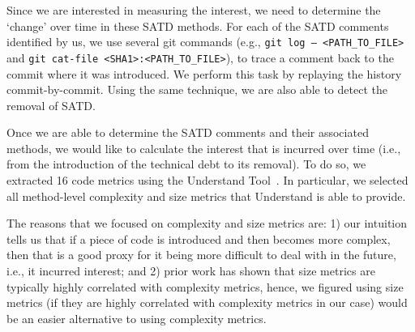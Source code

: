 Since we are interested in measuring the interest, we need to determine the `change' over time in these SATD methods. For each of the SATD comments identified by us, we use several git commands (e.g., {\tt git log -- <PATH\_TO\_FILE>} and {\tt git cat-file <SHA1>:<PATH\_TO\_FILE>}), to trace a comment back to the commit where it was introduced. We perform this task by replaying the history commit-by-commit. Using the same technique, we are also able to detect the removal of SATD.  


Once we are able to determine the SATD comments and their associated methods, we would like to calculate the interest that is incurred over time (i.e., from the introduction of the technical debt to its removal). To do so, we extracted 16 code metrics using the {\sc Understand Tool}~\cite{Understand}. In particular, we selected all method-level complexity and size metrics that Understand is able to provide.

The reasons that we focused on complexity and size metrics are: 1) our intuition tells us that if a piece of code is introduced and then becomes more complex, then that is a good proxy for it being more difficult to deal with in the future, i.e., it incurred interest; and 2) prior work has shown that size metrics are typically highly correlated with complexity metrics, hence, we figured using size metrics (if they are highly correlated with complexity metrics in our case) would be an easier alternative to using complexity metrics.

